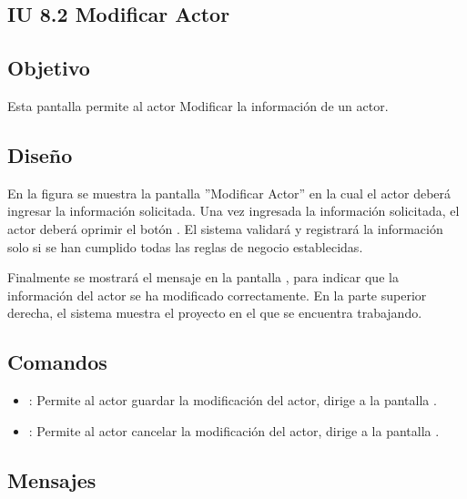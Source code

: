 \subsection{IU 8.2 Modificar Actor}

\subsection{Objetivo}
	Esta pantalla permite al actor Modificar la información de un actor.
\subsection{Diseño}
	En la figura  se muestra la pantalla ''Modificar Actor'' en la cual el actor deberá ingresar la información solicitada.
	Una vez ingresada la información solicitada, el actor deberá oprimir el botón  . El sistema validará y registrará la información solo si se han cumplido todas las reglas de negocio establecidas.
	
	Finalmente se mostrará el mensaje  en la pantalla , para indicar que la información del actor se ha modificado correctamente.
	En la parte superior derecha, el sistema muestra el proyecto en el que se encuentra trabajando.

\subsection{Comandos}
\begin{itemize}
	\item {}: Permite al actor guardar la modificación del actor, dirige a la pantalla .
	\item {}: Permite al actor cancelar la modificación del actor, dirige a la pantalla .
\end{itemize}

\subsection{Mensajes}

